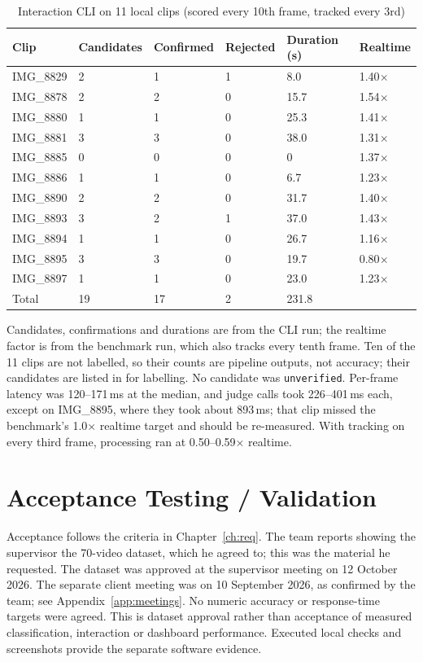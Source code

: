 \begin{table}[H]
\centering
\caption{Interaction CLI on 11 local clips (scored every 10th frame, tracked every 3rd)}
\label{tab:batch}
\begin{tabular}{P{0.14\textwidth}P{0.14\textwidth}P{0.12\textwidth}P{0.12\textwidth}P{0.14\textwidth}P{0.14\textwidth}}
\toprule
Clip & Candidates & Confirmed & Rejected & Duration (s) & Realtime\\
\midrule
IMG\_8829 & 2 & 1 & 1 & 8.0 & 1.40$\times$\\
IMG\_8878 & 2 & 2 & 0 & 15.7 & 1.54$\times$\\
IMG\_8880 & 1 & 1 & 0 & 25.3 & 1.41$\times$\\
IMG\_8881 & 3 & 3 & 0 & 38.0 & 1.31$\times$\\
IMG\_8885 & 0 & 0 & 0 & 0 & 1.37$\times$\\
IMG\_8886 & 1 & 1 & 0 & 6.7 & 1.23$\times$\\
IMG\_8890 & 2 & 2 & 0 & 31.7 & 1.40$\times$\\
IMG\_8893 & 3 & 2 & 1 & 37.0 & 1.43$\times$\\
IMG\_8894 & 1 & 1 & 0 & 26.7 & 1.16$\times$\\
IMG\_8895 & 3 & 3 & 0 & 19.7 & 0.80$\times$\\
IMG\_8897 & 1 & 1 & 0 & 23.0 & 1.23$\times$\\
\midrule
Total & 19 & 17 & 2 & 231.8 & \\
\bottomrule
\end{tabular}
\end{table}
Candidates, confirmations and durations are from the CLI run; the realtime factor is from the benchmark run, which also tracks every tenth frame. Ten of the 11 clips are not labelled, so their counts are pipeline outputs, not accuracy; their candidates are listed in  for labelling. No candidate was \texttt{unverified}. Per-frame latency was 120--171\,ms at the median, and judge calls took 226--401\,ms each, except on IMG\_8895, where they took about 893\,ms; that clip missed the benchmark's 1.0$\times$ realtime target and should be re-measured. With tracking on every third frame, processing ran at 0.50--0.59$\times$ realtime.

\section{Acceptance Testing / Validation}
Acceptance follows the criteria in Chapter~\ref{ch:req}. The team reports showing the supervisor the 70-video dataset, which he agreed to; this was the material he requested. The dataset was approved at the supervisor meeting on 12 October 2026. The separate client meeting was on 10 September 2026, as confirmed by the team; see Appendix~\ref{app:meetings}. No numeric accuracy or response-time targets were agreed. This is dataset approval rather than acceptance of measured classification, interaction or dashboard performance. Executed local checks and screenshots provide the separate software evidence.


